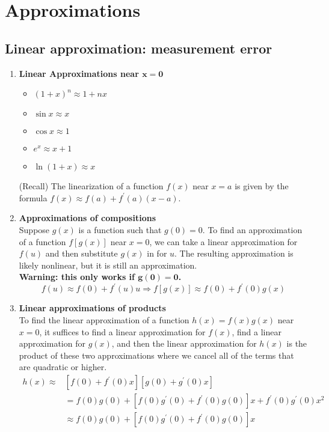 \chapter{Approximations}
\section{Linear approximation: measurement error}
\begin{enumerate}
    \item \textbf{Linear Approximations near $\bm{x=0}$}\\
        \begin{itemize}
            \item \((1+x)^n\approx 1+nx\)
            \item \(\sin x\approx x\)
            \item \(\cos x\approx 1\)
            \item \(e^x\approx x+1\)
            \item \(\ln(1+x)\approx x\)
        \end{itemize}
        \begin{note} (Recall) The linearization of a function \(f(x)\) near \(x=a\) is given by the formula \(f(x)\approx f(a)+f^\prime (a)(x-a)\). \end{note}
    \item \textbf{Approximations of compositions}\\
        \indent Suppose \(g(x)\) is a function such that \(g(0)=0\). To find an approximation of a function \(f[g(x)]\) near \(x=0\), we can take a linear approximation for \(f(u)\) and then substitute \(g(x)\) in for \(u\). The resulting approximation is likely nonlinear, but it is still an approximation.\\
        \indent\textbf{Warning: this only works if \(\bm{g(0)=0}\).}
        \[
            f(u)\approx f(0)+f^\prime (u)u\Rightarrow f[g(x)]\approx f(0)+f^\prime (0)g(x)
        \]
    \item \textbf{Linear approximations of products}\\
        \indent To find the linear approximation of a function \(h(x)=f(x)g(x)\) near \(x=0\), it suffices to find a linear approximation for \(f(x)\), find a linear approximation for \(g(x)\), and then the linear approximation for \(h(x)\) is the product of these two approximations where we cancel all of the terms that are quadratic or higher.
		\begin{align*}
            h(x)\approx{} & [f(0)+f^\prime (0)x][g(0)+g^\prime (0)x] \\
                 & =f(0)g(0)+[f(0)g^\prime (0)+f^\prime (0)g(0)]x+f^\prime (0)g^\prime (0)x^2 \\
                 & \approx f(0)g(0)+[f(0)g^\prime (0)+f^\prime (0)g(0)]x
        \end{align*}
\end{enumerate}

